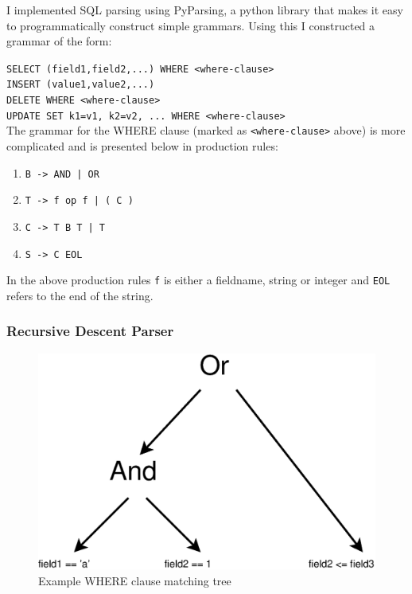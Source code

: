 \documentclass[12pt,twoside,notitlepage]{report}
\begin{document}
I implemented SQL parsing using PyParsing, a python library that makes it easy to programmatically
construct simple grammars. Using this I constructed a grammar of the form:

\verb+SELECT (field1,field2,...) WHERE <where-clause>+ \\
\verb+INSERT (value1,value2,...)+ \\
\verb+DELETE WHERE <where-clause>+ \\
\verb+UPDATE SET k1=v1, k2=v2, ... WHERE <where-clause>+ \\

The grammar for the WHERE clause (marked as \verb+<where-clause>+ above) is more complicated and
is presented below in production rules:
\begin{enumerate}
\item \verb+B -> AND | OR+
\item \verb+T -> f op f | ( C )+
\item \verb+C -> T B T | T+
\item \verb+S -> C EOL+
\end{enumerate}

In the above production rules \verb+f+ is either a fieldname, string or integer and \verb+EOL+
refers to the end of the string.

\subsubsection{Recursive Descent Parser}

\begin{figure}[H]
\centering
\includegraphics[scale=0.5]{figs/where-ast.eps}
\caption{\label{fig:where-ast}Example WHERE clause matching tree}
\end{figure}
\end{document}
